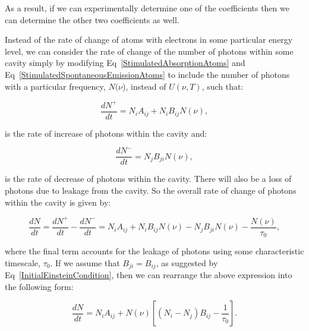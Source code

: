 \noindent As a result, if we can experimentally determine one of the coefficients then we can determine the other two coefficients as well.

\noindent Instead of the rate of change of atoms with electrons in some particular energy level, we can consider the rate of change of the number of photons within some cavity simply by modifying Eq~\ref{StimulatedAbsorptionAtoms} and Eq~\ref{StimulatedSpontaneousEmissionAtoms} to include the number of photons with a particular frequency, $N(\nu$), instead of $U(\nu, T)$, such that:

\begin{equation}
    \frac{dN^+}{dt} = N_i A_{ij} + N_i B_{ij} N(\nu),
    \label{StimulatedSpontaneousEmissionPhotons}
\end{equation}

\noindent is the rate of increase of photons within the cavity and:

\begin{equation}
    \frac{dN^-}{dt} = N_j B_{ji} N(\nu),
    \label{StimulatedAbsorptionPhotons}
\end{equation}

\noindent is the rate of decrease of photons within the cavity. There will also be a loss of photons due to leakage from the cavity. So the overall rate of change of photons within the cavity is given by:

\begin{equation}
    \frac{dN}{dt} = \frac{dN^+}{dt} - \frac{dN^-}{dt} = N_i A_{ij} + N_i B_{ij} N(\nu) - N_j B_{ji} N(\nu) - \frac{N(\nu)}{\tau_0},
    \label{OverallRateChangePhotons}
\end{equation}

\noindent where the final term accounts for the leakage of photons using some characteristic timescale, $\tau_0$. If we assume that $B_{ji} = B_{ij}$, as suggested by Eq~\ref{InitialEinsteinCondition}, then we can rearrange the above expression into the following form:

\begin{equation}
    \frac{dN}{dt} = N_i A_{ij} + N(\nu)[(N_i - N_j)B_{ij} - \frac{1}{\tau_0}].
    \label{OverallRateChangePhotonsRearranged}
\end{equation}

